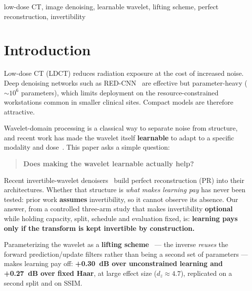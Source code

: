 \documentclass[conference]{IEEEtran}
\begin{document}
\begin{IEEEkeywords}
low-dose CT, image denoising, learnable wavelet, lifting scheme, perfect
reconstruction, invertibility
\end{IEEEkeywords}

\section{Introduction}

Low-dose CT (LDCT) reduces radiation exposure at the cost of increased noise.
Deep denoising networks such as RED-CNN~\cite{chen2017redcnn} are effective but
parameter-heavy ($\sim\!10^6$ parameters), which limits deployment on the
resource-constrained workstations common in smaller clinical sites. Compact
models are therefore attractive.

Wavelet-domain processing is a classical way to separate noise from structure,
and recent work has made the wavelet itself \textbf{learnable} to adapt to a
specific modality and dose~\cite{liu2018mwcnn,li2020wavecnet,huang2021linn,%
huang2022winnet,wang2026adasffuse,wang2025wavefusion}. This paper asks a simple
question:

\begin{quote}
\textbf{Does making the wavelet learnable actually help?}
\end{quote}

Recent invertible-wavelet denoisers~\cite{huang2021linn,huang2022winnet} build
perfect reconstruction (PR) into their architectures. Whether that structure is
\emph{what makes learning pay} has never been tested: prior work
\textbf{assumes} invertibility, so it cannot observe its absence. Our answer,
from a controlled three-arm study that makes invertibility \textbf{optional}
while holding capacity, split, schedule and evaluation fixed, is: \textbf{learning
pays only if the transform is kept invertible by construction.}

Parameterizing the wavelet as a \textbf{lifting
scheme}~\cite{daubechies1998factoring,sweldens1996lifting} --- the inverse
\emph{reuses} the forward prediction/update filters rather than being a second
set of parameters --- makes learning pay off: \textbf{+0.30~dB over unconstrained
learning and +0.27~dB over fixed Haar}, at large effect size ($d_z \approx 4.7$),
replicated on a second split and on SSIM.
\end{document}

